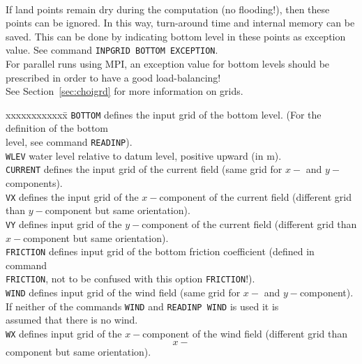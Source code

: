 \documentclass[12pt]{book}
\begin{document}
\\[2ex]
\noindent
If land points remain dry during the computation (no flooding!), then these points can be ignored.
In this way, turn-around time and internal memory can be saved. This can be done by indicating bottom level in these points as
exception value. See command {\tt INPGRID BOTTOM EXCEPTION}.
\\[2ex]
\noindent
For parallel runs using MPI, an exception value for bottom levels should be prescribed in order
to have a good load-balancing!
\\[2ex]
\noindent
See Section~\ref{sec:choigrd} for more information on grids.
\begin{tabbing}
xxxxxxxxxxxx\= \kill
{\tt BOTTOM}        \> defines the input grid of the bottom level. (For the definition of the bottom\+\\
                       level, see command {\tt READINP}).\-\\
{\tt WLEV}          \> water level relative to datum level, positive upward (in m).\\
{\tt CURRENT}       \> defines the input grid of the current field (same grid for $x-$ and $y-$components).\\
{\tt VX}            \> defines the input grid of the $x-$component of the current field (different grid\+\\
                       than $y-$component but same orientation).\-\\
{\tt VY}            \> defines input grid of the $y-$component of the current field (different grid than\+\\
                       $x-$component but same orientation).\-\\
{\tt FRICTION}      \> defines input grid of the bottom friction coefficient (defined in command\+\\
                       {\tt FRICTION}, not to be confused with this option {\tt FRICTION}!).\-\\
{\tt WIND}          \> defines input grid of the wind field (same grid for $x-$ and $y-$component).\+\\
                       If neither of the commands {\tt WIND} and {\tt READINP WIND} is used it is\\
                       assumed that there is no wind.\-\\
{\tt WX}            \> defines input grid of the $x-$component of the wind field (different grid than\+\\
                       $$x-$$component but same orientation).\-\\

\end{tabbing}
\end{document}
